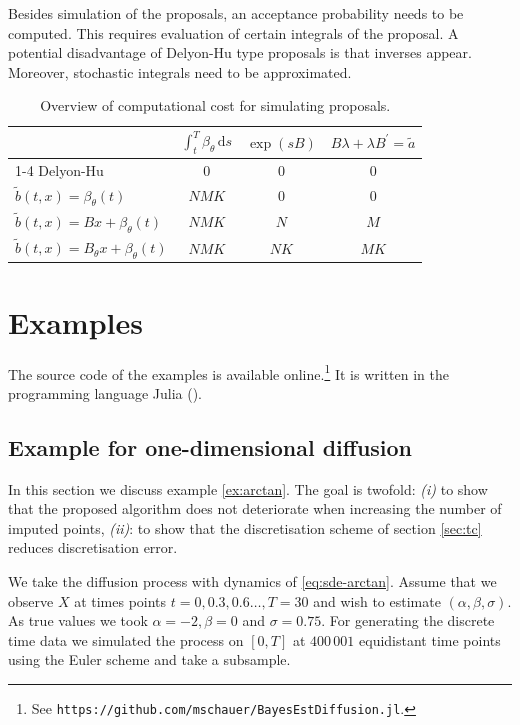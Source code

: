 \documentclass[preprint]{imsart}
\renewcommand{\th}{\theta}
\renewcommand{\tilde}{\widetilde}
\newcommand{\rara}[1]{\renewcommand{\arraystretch}{#1}}
\theoremstyle{definition}
\newcommand{\dd}{{\,\mathrm d}}
\newcommand{\T}{{\prime}}
\begin{document}
Besides simulation of the proposals, an acceptance probability needs to be computed. This requires evaluation of certain integrals of the proposal. A potential disadvantage of Delyon-Hu type proposals is that inverses appear. Moreover, stochastic integrals need to be approximated. 



{
\newcommand{\smallcdot}{}
\begin{table}
\label{table:comp}
\centering \rara{1.3}
	\small\begin{tabular}{lccc}\toprule 
		&  $\int_{t}^{T} \beta_\th \dd s$ & $\exp\left(s B\right)$ & $B \lambda + \lambda  B^\T = \tilde{a}$ \\
		\cmidrule{1-4}
		Delyon-Hu  &  0 & 0 & 0\\
		$\tilde b(t,x) = \beta_\theta(t)$ & $N\smallcdot M\smallcdot K$ & 0 & 0\\
		$\tilde b(t,x) = B x + \beta_\theta(t)$  &$N\smallcdot M \smallcdot K $& $N$ & $M$\\ 
		$\tilde b(t,x) = B_\theta x + \beta_\theta(t)$ &$N\smallcdot M \smallcdot K $& $N\smallcdot K$ & $M  \smallcdot K$\\ 
	\end{tabular}
\caption{Overview of computational cost for simulating proposals.}
\end{table}	
}






 

\section{Examples}\label{sec:examples}
The source code of the examples is available online.\footnote{See {\tt https://github.com/mschauer/BayesEstDiffusion.jl}.} It is  written in the programming language Julia (\cite{julia}).

\subsection{Example for one-dimensional diffusion}\label{sec:onedim-example}
In this section we discuss example \ref{ex:arctan}. The goal is twofold: {\it (i)} to show that the proposed algorithm does not deteriorate when  increasing the number of imputed points, {\it (ii)}: to show that the discretisation scheme of section \ref{sec:tc}  reduces discretisation error. 

We take the  diffusion process with dynamics of \eqref{eq:sde-arctan}.
Assume that we observe $X$  at times points $t=0, 0.3, 0.6\dots, T=30$ and wish to estimate $(\alpha, \beta, \sigma)$. As true values we took $\alpha = -2, \beta = 0$ and $\sigma = 0.75$. For generating the discrete time data  we simulated the process on $[0,T]$ at $400\,001$ equidistant time points using the Euler scheme and take a subsample. 
\end{document}
